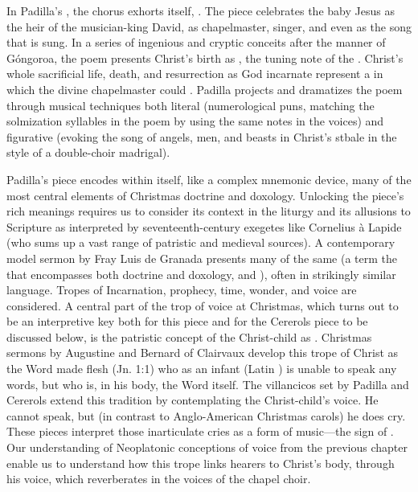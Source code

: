 \documentclass[tt]{vcbook-proposal}
\begin{document}
In Padilla's , the chorus exhorts itself, .
The piece celebrates the baby Jesus as the heir of the musician-king David, as chapelmaster, singer, and even as the song that is sung.
In a series of ingenious and cryptic conceits after the manner of Góngoroa, the poem presents Christ's birth as , the tuning note of the .
Christ's whole sacrificial life, death, and resurrection as God incarnate represent a  in which the divine chapelmaster could .
Padilla projects and dramatizes the poem through musical techniques both literal (numerological puns, matching the solmization syllables in the poem by using the same notes in the voices) and figurative (evoking the song of angels, men, and beasts in Christ's stbale in the style of a double-choir madrigal).

Padilla's piece encodes within itself, like a complex mnemonic device, many of the most central elements of Christmas doctrine and doxology.
Unlocking the piece's rich meanings requires us to consider its context in the liturgy and its allusions to Scripture as interpreted by seventeenth-century exegetes like Cornelius à Lapide (who sums up a vast range of patristic and medieval sources). 
A contemporary model sermon by Fray Luis de Granada presents many of the same  (a term the that encompasses both doctrine and doxology,  and ), often in strikingly similar language.
Tropes of Incarnation, prophecy, time, wonder, and voice are considered.
A central part of the trop of voice at Christmas, which turns out to be an interpretive key both for this piece and for the Cererols piece to be discussed below, is the patristic concept of the Christ-child as . 
Christmas sermons by Augustine and Bernard of Clairvaux develop this trope of Christ as the Word made flesh (Jn. 1:1) who as an infant (Latin ) is unable to speak any words, but who is, in his body, the Word itself.
The villancicos set by Padilla and Cererols extend this tradition by contemplating the Christ-child's voice.
He cannot speak, but (in contrast to Anglo-American Christmas carols) he does cry.
These pieces interpret those inarticulate cries as a form of music---the sign of .
Our understanding of Neoplatonic conceptions of voice from the previous chapter enable us to understand how this trope links hearers to Christ's body, through his voice, which reverberates in the voices of the chapel choir.
\end{document}
